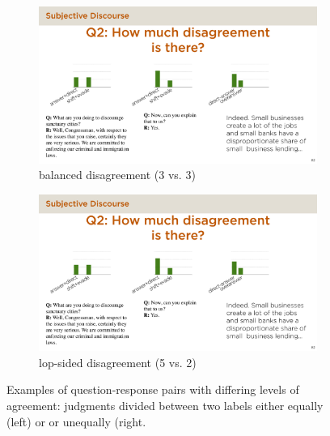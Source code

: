 \begin{figure}[t]
 \centering
 \vspace{-1.2em}
  \begin{subfigure}{.5\textwidth}
  \centering
  \includegraphics[scale=0.25]{plots/subj_level_disagree1.pdf}
  \vspace{-.3em}
  \caption{balanced disagreement (3 vs. 3)}
  \label{fig:subj_level_disagree_equal}
\end{subfigure}%
  \begin{subfigure}{.5\textwidth}
  \centering
  \includegraphics[scale=0.25]{plots/subj_level_disagree2.pdf}
  \vspace{-.3em}
  \caption{lop-sided disagreement (5 vs. 2)}
  \label{fig:subj_level_disagree_unequal}
\end{subfigure}
\vspace{-0.5em}
  \caption{Examples of question-response pairs with differing levels of agreement: judgments divided between two labels either equally (left) or or unequally (right.}
  \label{fig:subj_level_disagree}
  \vspace{-.3em}
\end{figure}

